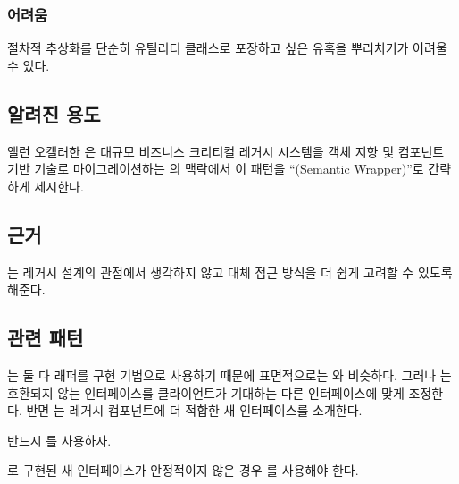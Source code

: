 \documentclass[a4paper,10pt,twoside]{book}
\begin{document}
\subsubsection*{어려움}

\begin{bulletlist}
\item 절차적 추상화를 단순히 유틸리티 클래스로 포장하고 싶은 유혹을 뿌리치기가 어려울 수 있다.
\end{bulletlist}

\subsection*{알려진 용도}

앨런 오캘러한 \cite{Ocal00a}은 대규모 비즈니스 크리티컬 레거시 시스템을 객체 지향 및 컴포넌트 기반 기술로 마이그레이션하는 의 맥락에서 이 패턴을 ``(Semantic Wrapper)''로 간략하게 제시한다. 

\subsection*{근거}

는 레거시 설계의 관점에서 생각하지 않고 대체 접근 방식을 더 쉽게 고려할 수 있도록 해준다.

\subsection*{관련 패턴}

는 둘 다 래퍼를 구현 기법으로 사용하기 때문에 표면적으로는 와 비슷하다. 그러나 는 호환되지 않는 인터페이스를 클라이언트가 기대하는 다른 인터페이스에 맞게 조정한다. 반면 는 레거시 컴포넌트에 더 적합한 새 인터페이스를 소개한다. 

반드시 를 사용하자. 

로 구현된 새 인터페이스가 안정적이지 않은 경우 를 사용해야 한다.

\end{document}
